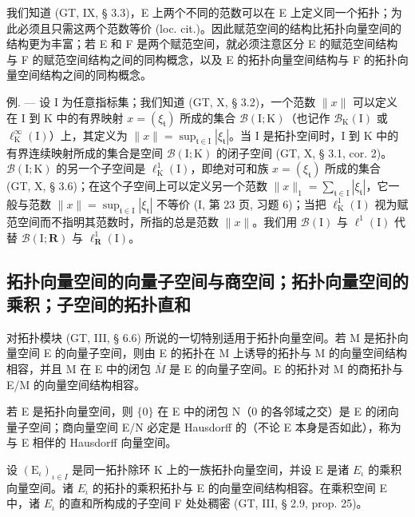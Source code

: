 我们知道 (GT, IX, § 3.3)，E 上两个不同的范数可以在 E 上定义同一个拓扑；为此必须且只需这两个范数等价 (loc. cit.)。因此赋范空间的结构比拓扑向量空间的结构更为丰富；若 E 和 F 是两个赋范空间，就必须注意区分 E 的赋范空间结构与 F 的赋范空间结构之间的同构概念，以及 E 的拓扑向量空间结构与 F 的拓扑向量空间结构之间的同构概念。

例. --- 设 I 为任意指标集；我们知道 (GT, X, § 3.2)，一个范数 \(\|x\|\) 可以定义在 I 到 K 中的有界映射 \(x = (\xi_{\mathfrak{t}})\) 所成的集合 \(\mathcal{B}(\mathrm{I};\mathrm{K})\)（也记作 \(\mathcal{B}_{\mathrm{K}}(\mathrm{I})\) 或 \(\ell_{\mathrm{K}}^{\infty}(\mathrm{I})\)）上，其定义为 \(\|x\| = \sup_{\mathfrak{t}\in \mathrm{I}}|\xi_{\mathfrak{t}}|\)。当 I 是拓扑空间时，I 到 K 中的有界连续映射所成的集合是空间 \(\mathcal{B}(\mathrm{I};\mathrm{K})\) 的闭子空间 (GT, X, § 3.1, cor. 2)。\(\mathcal{B}(\mathrm{I};\mathrm{K})\) 的另一个子空间是 \(\ell_{\mathrm{K}}^{1}(\mathrm{I})\)，即绝对可和族 \(x = (\xi_{\mathfrak{t}})\) 所成的集合 (GT, X, § 3.6)；在这个子空间上可以定义另一个范数 \(\|x\|_1 = \sum_{\mathfrak{t}\in \mathrm{I}}|\xi_{\mathfrak{t}}|\)，它一般与范数 \(\|x\| = \sup_{\mathfrak{t}\in \mathrm{I}}|\xi_{\mathfrak{t}}|\) 不等价 (I, 第 23 页, 习题 6)；当把 \(\ell_{\mathrm{K}}^{1}(\mathrm{I})\) 视为赋范空间而不指明其范数时，所指的总是范数 \(\|x\|\)。我们用 \(\mathcal{B}(\mathrm{I})\) 与 \(\ell^1 (\mathrm{I})\) 代替 \(\mathcal{B}(\mathrm{I};\mathbf{R})\) 与 \(\ell_{\mathbf{R}}^{1}(\mathrm{I})\)。

\subsection{拓扑向量空间的向量子空间与商空间；拓扑向量空间的乘积；子空间的拓扑直和}

对拓扑模块 (GT, III, § 6.6) 所说的一切特别适用于拓扑向量空间。若 M 是拓扑向量空间 E 的向量子空间，则由 E 的拓扑在 M 上诱导的拓扑与 M 的向量空间结构相容，并且 M 在 E 中的闭包 \(\overline{M}\) 是 E 的向量子空间。E 的拓扑对 M 的商拓扑与 E/M 的向量空间结构相容。

若 E 是拓扑向量空间，则 \(\{0\}\) 在 E 中的闭包 N（0 的各邻域之交）是 E 的闭向量子空间；商向量空间 E/N 必定是 Hausdorff 的（不论 E 本身是否如此），称为与 E 相伴的 Hausdorff 向量空间。

设 \((\mathrm{E}_{\iota})_{\iota \in I}\) 是同一拓扑除环 K 上的一族拓扑向量空间，并设 E 是诸 \(E_{\iota}\) 的乘积向量空间。诸 \(E_{\iota}\) 的拓扑的乘积拓扑与 E 的向量空间结构相容。在乘积空间 E 中，诸 \(E_{\iota}\) 的直和所构成的子空间 F 处处稠密 (GT, III, § 2.9, prop. 25)。

